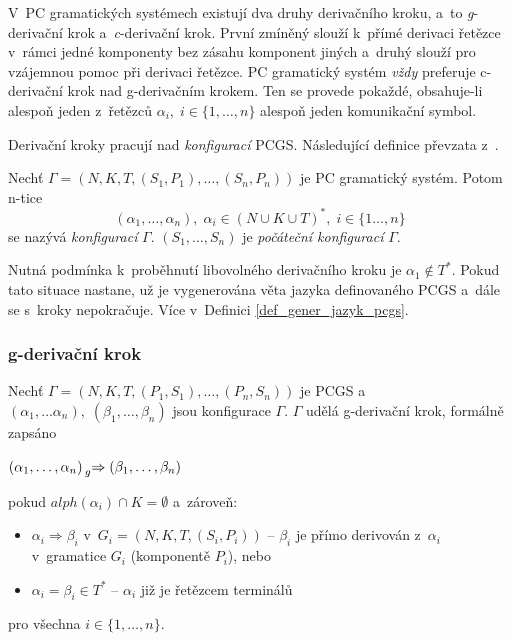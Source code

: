 V~PC gramatických systémech existují dva druhy derivačního kroku, a~to \emph{g}-derivační krok a~\emph{c}-derivační krok.
První zmíněný slouží k~přímé derivaci řetězce v~rámci jedné komponenty bez zásahu komponent jiných a~druhý slouží pro vzájemnou pomoc při derivaci řetězce. 
PC gramatický systém \emph{vždy} preferuje c-derivační krok nad g-derivačním krokem.
Ten se provede pokaždé, obsahuje-li alespoň jeden z~řetězců $\alpha_i,\; i \in \{1, \ldots, n\}$ alespoň jeden komunikační symbol.

Derivační kroky pracují nad \emph{konfigurací} PCGS.
Následující definice převzata z~\cite{Various-communications-in-PC-grammar-systems}.
\begin{definition}
    Nechť $\Gamma = (N, K, T, (S_1, P_1), \ldots, (S_n, P_n))$ je PC gramatický systém.
    Potom n-tice
    \begin{equation*}
        (\alpha_1, \ldots, \alpha_n),\; \alpha_i \in (N \cup K \cup T)^*,\; i \in \{1 \ldots, n\}
    \end{equation*}
    se nazývá \emph{konfigurací} $\Gamma$. $(S_1, \ldots, S_n)$ je \emph{počáteční konfigurací} $\Gamma$.
\end{definition}
Nutná podmínka k~proběhnutí libovolného derivačního kroku je $\alpha_1 \notin T^*$.
Pokud tato situace nastane, už je vygenerována věta jazyka definovaného PCGS a~dále se s~kroky nepokračuje. 
Více v~Definici \ref{def_gener_jazyk_pcgs}.

\subsubsection*{g-derivační krok}\label{kap_g_der_krok}
Nechť $\Gamma = (N, K, T, (P_1, S_1), \ldots, (P_n, S_n))$ je PCGS a~$(\alpha_1, \ldots \alpha_n),\; (\beta_1, \ldots, \beta_n)$ jsou konfigurace $\Gamma$.
$\Gamma$ udělá g-derivační krok, formálně zapsáno
\begin{center}
    $(\alpha_1, \ldots, \alpha_n) \prescript{}{g}{\Rightarrow{}} (\beta_1, \ldots, \beta_n)$
\end{center}
pokud $alph(\alpha_i) \cap K = \emptyset$ a~zároveň:
\begin{itemize}
    \item $\alpha_i \Rightarrow \beta_i$ v~$G_i = (N, K, T, (S_i, P_i))$ -- $\beta_i$ je přímo derivován z~$\alpha_i$ v~gramatice $G_i$ (komponentě $P_i$), nebo
    \item $\alpha_i = \beta_i \in T^*$ -- $\alpha_i$ již je řetězcem terminálů
\end{itemize}   
pro všechna $i \in \{1, \ldots, n\}$.

